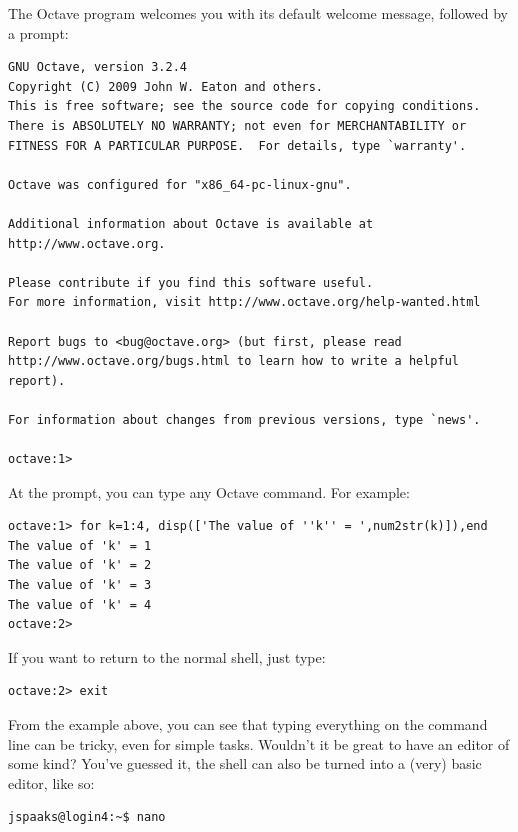 The Octave program welcomes you with its default welcome message, followed by a prompt:
\begin{lstlisting}[style=basic,style=bash]
GNU Octave, version 3.2.4
Copyright (C) 2009 John W. Eaton and others.
This is free software; see the source code for copying conditions.
There is ABSOLUTELY NO WARRANTY; not even for MERCHANTABILITY or
FITNESS FOR A PARTICULAR PURPOSE.  For details, type `warranty'.

Octave was configured for "x86_64-pc-linux-gnu".

Additional information about Octave is available at http://www.octave.org.

Please contribute if you find this software useful.
For more information, visit http://www.octave.org/help-wanted.html

Report bugs to <bug@octave.org> (but first, please read
http://www.octave.org/bugs.html to learn how to write a helpful report).

For information about changes from previous versions, type `news'.

octave:1> 
\end{lstlisting}
At the prompt, you can type any Octave command. For example: 
\begin{lstlisting}[style=basic,style=bash]
octave:1> for k=1:4, disp(['The value of ''k'' = ',num2str(k)]),end
The value of 'k' = 1
The value of 'k' = 2
The value of 'k' = 3
The value of 'k' = 4
octave:2> 
\end{lstlisting}
If you want to return to the normal shell, just type: 
\begin{lstlisting}[style=basic,style=bash]
octave:2> exit
\end{lstlisting}

From the example above, you can see that typing everything on the command line can be tricky, even for simple tasks. Wouldn't it be great to have an editor of some kind? You've guessed it, the shell can also be turned into a (very) basic editor, like so:
\begin{lstlisting}[style=basic,style=bash]
jspaaks@login4:~$ nano
\end{lstlisting}

